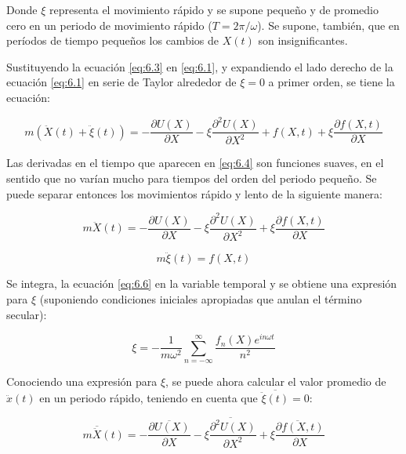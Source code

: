 Donde $\xi$ representa el movimiento rápido y se supone pequeño y de promedio cero en un periodo de movimiento rápido  ($T=2\pi/\omega$). Se supone, también, que en períodos de tiempo pequeños  los cambios de $X(t)$ son insignificantes. 

Sustituyendo la ecuación \ref{eq:6.3} en \ref{eq:6.1}, y expandiendo el lado derecho de la ecuación \ref{eq:6.1} en serie de Taylor alrededor de $\xi=0$ a primer orden, se tiene la ecuación:

\begin{equation}\label{eq:6.4}
    m(\ddot{X}(t) + \ddot{\xi}(t))=-\frac{\partial U(X)}{\partial X}-\xi\frac{\partial^2 U(X)}{\partial X^2}+f(X,t)+\xi\frac{\partial f(X,t)}{\partial X}
\end{equation}

Las derivadas en el tiempo que aparecen en \ref{eq:6.4} son funciones suaves, en el sentido que no varían mucho para tiempos del orden del periodo pequeño. Se puede separar entonces los movimientos rápido y lento de la siguiente manera:

\begin{equation}\label{eq:6.5}
    m\ddot{X}(t) =-\frac{\partial U(X)}{\partial X}-\xi\frac{\partial^2 U(X)}{\partial X^2}+\xi\frac{\partial f(X,t)}{\partial X}
\end{equation}

\begin{equation}\label{eq:6.6}
    m\ddot{\xi}(t)=f(X,t)
\end{equation}

Se integra, la ecuación \ref{eq:6.6} en la variable temporal y se obtiene una expresión  para $\xi$ (suponiendo condiciones iniciales apropiadas que anulan el término secular):

\begin{equation}\label{eq:6.7}
    \xi=-\frac{1}{m\omega^2}\sum^{\infty}_{n=-\infty} \frac{f_n(X)e^{in\omega t}}{n^2}
\end{equation}
 
Conociendo una expresión para $\xi$, se puede ahora calcular el valor promedio de $\ddot{x}(t)$ en un periodo rápido, teniendo en cuenta que $\overline{\ddot{\xi}(t)}=0$:

\begin{equation}\label{eq:6.8}
    m\overline{\ddot{X}}(t) =-\overline{\frac{\partial U(X)}{\partial X}}-\overline{\xi\frac{\partial^2 U(X)}{\partial X^2}}+\overline{\xi\frac{\partial f(X,t)}{\partial X}}
\end{equation}

